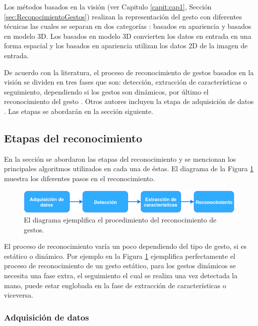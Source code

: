 Los métodos basados en la visión (ver Capitulo \ref{capit:cap1}, Sección \ref{sec:ReconocimientoGestos}) realizan la representación del gesto con diferentes técnicas las cuales se separan en dos categorías \citep{Rautaray2012}: basados en apariencia y basados en  modelo 3D. Los basados en modelo 3D convierten los datos en entrada en una forma espacial y los basados en apariencia utilizan los datos 2D de la imagen de entrada.      

De acuerdo con la literatura, el proceso de reconocimiento de gestos basados en la visión se dividen en tres fases que son: detección, extracción de características o seguimiento, dependiendo si los gestos son dinámicos, por último el reconocimiento del gesto \citep{Rautaray2012}. Otros autores incluyen la etapa de adquisición de datos \citep{Hasan2012}. Las etapas se abordarán en la sección siguiente. 


\subsection{Etapas del reconocimiento}\label{subsec:EtapasReconocimiento}  
En la sección se abordaron las etapas del reconocimiento y se mencionan los principales algoritmos utilizados en cada una de éstas. El diagrama de la Figura \ref{fig:HGR} muestra los diferentes pasos en el reconocimiento.  

\begin{figure}[h!]
\begin{center}
\includegraphics[scale=.6]{./Figures/HGR.png}
\end{center}
\caption{El diagrama ejemplifica el procedimiento del reconocimiento de gestos.}
\label{fig:HGR}
\end{figure}

El proceso de reconocimiento varía un poco dependiendo del tipo de gesto, si es estático o dinámico. Por ejemplo en la Figura \ref{fig:HGR} ejemplifica perfectamente el proceso de reconocimiento de un gesto estático, para los gestos dinámicos se necesita una fase extra, el seguimiento el cual se realiza una vez detectada la mano, puede estar englobada en la fase de extracción de características o viceversa. 


\subsubsection{Adquisición de datos}\label{sssec:EtapaAdquisicion}


